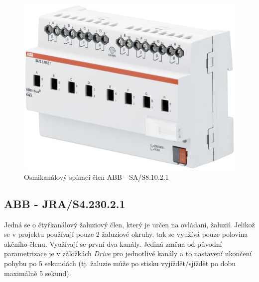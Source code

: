 \begin{figure}[!ht]
  \begin{center}
    \includegraphics[scale=0.25]{obrazky/ABB aktor1.jpg}
  \end{center}
  \caption[Osmikanálový spínací člen ABB - SA/S8.10.2.1 \cite{ABB aktor1}]{Osmikanálový spínací člen ABB - SA/S8.10.2.1  \cite{ABB aktor1}}
  \label{fig:Osmikanálový spínací člen ABB - SA/S8.10.2.1}
\end{figure}

\subsection{ABB - JRA/S4.230.2.1}
Jedná se o čtyřkanálový žaluziový člen, který je určen na ovládaní, žaluzií. Jelikož se v projektu používají pouze 2 žaluziové okruhy, tak se využívá pouze polovina akčního členu. Využívají se první dva kanály. Jediná změna od původní parametrizace je v záložkách \textit{Drive} pro jednotlivé kanály a to nastavení ukončení pohybu po 5 sekundách (tj. žaluzie může po stisku vyjíždět/sjíždět po dobu maximálně 5 sekund). 

